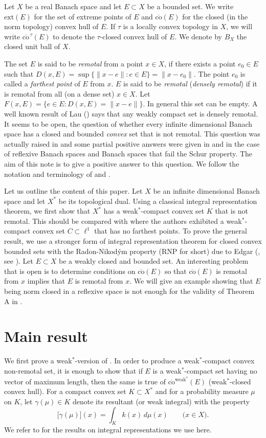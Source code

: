 \documentclass[11pt,a4paper]{amsart}
\theoremstyle{plain}
\theoremstyle{definition}
\newcommand{\extr}{\ensuremath{\mathrm{ext}}}
\newcommand{\cconv}{\overline{\mathrm{co}}}
\begin{document}
Let $X$ be a real Banach space and let $E \subset X$ be a bounded
set. We write $\extr(E)$ for the set of extreme points of $E$ and
$\cconv(E)$ for the closed (in the norm topology) convex hull of
$E$. If $\tau$ is a locally convex topology in $X$, we will write
$\cconv^{\,\tau}(E)$ to denote the $\tau$-closed convex hull of
$E$. We denote by $B_X$ the closed unit ball of $X$.

The set $E$ is said to be \emph{remotal} from a point $x\in X$, if
there exists a point $e_0 \in E$ such that $D(x,E)=\sup\{\|x-e\|:e
\in E \} = \|x-e_0\|$. The point $e_0$ is  called a \emph{farthest
point} of $E$ from $x$. $E$ is said to be \emph{remotal}
(\emph{densely remotal}) if it is remotal from all (on a dense set)
$x\in X$.  Let $F(x,E)=\{e\in E: D(x,E)=\|x-e\|\}$. In general this
set can be empty. A well known result of Lau (\cite{Lau}) says that
any weakly compact set is densely remotal. It seems to be open, the
question of whether every infinite dimensional Banach space has a
closed and bounded \emph{convex} set that is not remotal. This
question was actually raised in \cite{S} and some partial positive
answers were given in \cite{S} and \cite{R} in the case of reflexive
Banach spaces and Banach spaces that fail the Schur property. The
aim of this note is to give a positive answer to this question. We
follow the notation and terminology of \cite{S} and \cite{R}.

Let us outline the content of this paper. Let $X$ be an infinite
dimensional Banach space and let $X^\ast$ be its topological dual.
Using a classical integral representation theorem, we first show
that $X^\ast$ has a weak$^\ast$-compact convex set $K$ that is not
remotal. This should be compared with \cite[Proposition~1]{DZ} where
the authors exhibited a weak$^\ast$-compact convex set $C \subset
\ell^1$ that has no farthest points. To prove the general result, we
use a stronger form of integral representation theorem for closed
convex bounded sets with the Radon-Nikod\'{y}m property (RNP for
short) due to Edgar (\cite{E}, see \cite[Theorem~16.12]{Phelps}).
Let $E \subset X$ be a weakly closed and bounded set. An interesting
problem that is open is to determine conditions on $\cconv(E)$ so
that  $\cconv(E)$ is remotal from $x$ implies that $E$ is remotal
from $x$. We will give an example showing that $E$ being  norm
closed in a reflexive space is not enough for the validity of
Theorem A in \cite{S}.


\section{Main result}
We first prove a weak$^\ast$-version of \cite[Theorem~A]{S}. In
order to produce a weak$^\ast$-compact convex non-remotal set, it
is enough to show that if $E$ is a weak$^\ast$-compact set having
no vector of maximum length, then the same is true of
$\cconv^{\textrm{weak}^\ast}(E)$ (weak$^\ast$-closed convex hull).
For a compact convex set $K\subset X^\ast$ and for a probability
measure $\mu$ on $K$, let $\gamma(\mu) \in K$ denote its resultant
(or weak integral) with the property
$$
\bigl[\gamma(\mu)\bigr](x)=\int_K k(x)\, d\mu(x) \qquad \bigl(x\in X\bigr).
$$
We refer to \cite{D,Phelps} for the results on integral
representations we use here.
\end{document}
